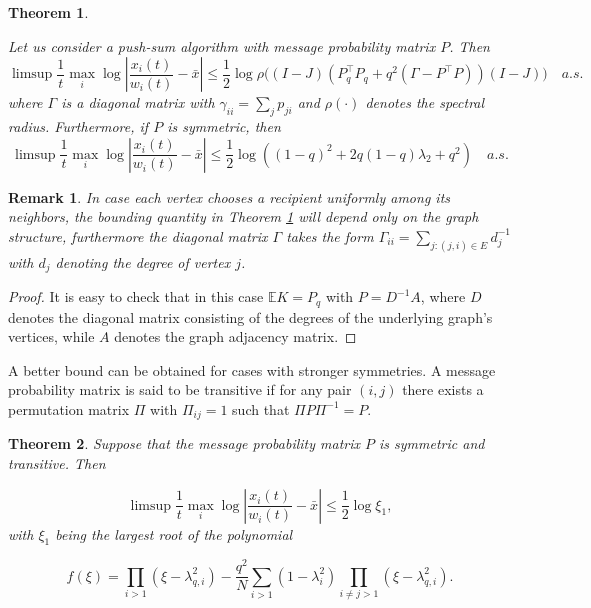 \documentclass[a4paper,12pt]{article}
\newtheorem{theorem}{Theorem}
\newtheorem{remark}{Remark}
\begin{document}
\begin{theorem}
	\label{thm:general_rate}
	
	Let us consider a push-sum algorithm with message probability matrix $P$. Then
	\begin{equation}
		\label{eq:general_rate}
		\limsup \frac1t \max_i\log \left|\frac{x_i(t)}{w_i(t)}-\bar x\right| \leq \frac 12 \log\rho\bigg( (I-J) (P_q^\top P_q + q^2(\Gamma -P^\top P))(I-J)\bigg) \quad a.s.
	\end{equation}
	where $\Gamma$ is a diagonal matrix with $\gamma_{ii} = \sum_j p_{ji}$ and $\rho(\cdot)$ denotes the spectral radius.
	Furthermore, if $P$ is symmetric, then
	\begin{equation}
		\label{eq:general_rate_symmetric}
		\limsup \frac1t \max_i\log \left|\frac{x_i(t)}{w_i(t)}-\bar x \right| \leq \frac 12 \log ((1-q)^2 + 2q(1-q)\lambda_2 + q^2) \quad a.s.
	\end{equation}
\end{theorem}
\begin{remark}
	\label{cor:general_rate_graph}
	In case each vertex chooses a recipient uniformly among its neighbors, the bounding quantity in Theorem \ref{thm:general_rate} will depend only on the graph structure, furthermore the diagonal matrix $\Gamma$ takes the form $\Gamma_{ii}=\sum\limits_{j:(j,i)\in E}d_{j}^{-1}$ with $d_j$ denoting the degree of vertex $j$. 
	
\end{remark}
\begin{proof}
	It is easy to check that in this case $\mathbb E K = P_q$ with $ P=D^{-1} A$, where $D$ denotes the diagonal matrix consisting of the degrees of the underlying graph's vertices, while $A$ denotes the graph adjacency matrix.	
	
\end{proof}
A better bound can be obtained for cases with stronger symmetries. A message probability matrix is said to be transitive if for any pair $(i,j)$ there exists a permutation matrix $\Pi$ with $\Pi_{ij} = 1$ such that $ \Pi P \Pi^{-1} = P$.
\begin{theorem}
	\label{thm:special_rate}
	Suppose that the message probability matrix $P$ is symmetric and transitive. Then 

	\begin{equation}
		\label{eq:transitive_rate}
		\limsup \frac1t \max_i\log \left|\frac{x_i(t)}{w_i(t)}-\bar x\right| \leq \frac 12 \log\xi_1,
	\end{equation}
	with $\xi_1$ being the largest root of the polynomial

	$$ f(\xi) =  \prod_{i>1} (\xi-\lambda_{q,i}^2) - \frac{q^2}N \sum_{i>1} (1-\lambda_i^2)\prod_{i\neq j>1} (\xi-\lambda_{q,i}^2). $$
\end{theorem}
\end{document}
